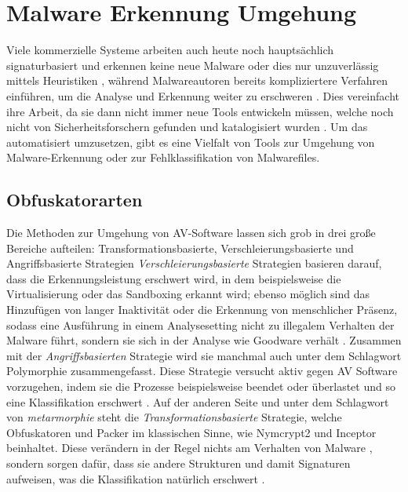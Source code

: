 \section{Malware Erkennung Umgehung}
\label{Sec:MalwareEvasion}
Viele kommerzielle Systeme arbeiten auch heute noch hauptsächlich signaturbasiert und erkennen keine neue Malware oder dies nur unzuverlässig mittels Heuristiken \cite{rathore_2023_breaking}, während Malwareautoren bereits kompliziertere Verfahren einführen, um die Analyse und Erkennung weiter zu erschweren \cite{nunes_2022_bane}. Dies vereinfacht ihre Arbeit, da sie dann nicht immer neue Tools entwickeln müssen, welche noch nicht von Sicherheitsforschern gefunden und katalogisiert wurden \cite{holm_2023_hide}. Um das automatisiert umzusetzen, gibt es eine Vielfalt von Tools zur Umgehung von Malware-Erkennung oder zur Fehlklassifikation von Malwarefiles.

\subsection{Obfuskatorarten}
Die Methoden zur Umgehung von AV-Software lassen sich grob in drei große Bereiche aufteilen: Transformationsbasierte, Verschleierungsbasierte und Angriffsbasierte Strategien \cite{geng_2024_a}
\textit{Verschleierungsbasierte} Strategien basieren darauf, dass die Erkennungsleistung erschwert wird, in dem beispielsweise die Virtualisierung oder das Sandboxing erkannt wird; ebenso möglich sind das Hinzufügen von langer Inaktivität  oder die Erkennung von menschlicher Präsenz, sodass eine Ausführung in einem Analysesetting nicht zu illegalem Verhalten der Malware führt, sondern sie sich in der Analyse wie Goodware verhält \cite{geng_2024_a}. Zusammen mit der \textit{Angriffsbasierten} Strategie wird sie manchmal auch unter dem Schlagwort Polymorphie \cite{elsersy_2022_the} zusammengefasst. Diese Strategie versucht aktiv gegen AV Software vorzugehen, indem sie die Prozesse beispielsweise beendet oder überlastet und so eine Klassifikation erschwert \cite{geng_2024_a}. 
Auf der anderen Seite und unter dem Schlagwort von \textit{metarmorphie} \cite{elsersy_2022_the} steht die \textit{Transformationsbasierte} Strategie, welche Obfuskatoren und Packer im klassischen Sinne, wie Nymcrypt2 und Inceptor beinhaltet. Diese verändern in der Regel nichts am Verhalten von Malware \cite{wauters_2024_building}, sondern sorgen dafür, dass sie andere Strukturen und damit Signaturen aufweisen, was die Klassifikation natürlich erschwert \cite{geng_2024_a}.


